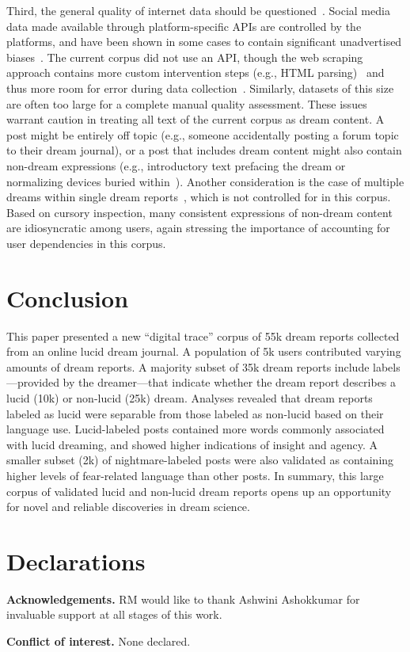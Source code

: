 \documentclass[10pt,a4paper,twocolumn]{article}
\begin{document}
\par
Third, the general quality of internet data should be questioned~\cite{ruths2014,rafaeli2019}. Social media data made available through platform-specific APIs are controlled by the platforms, and have been shown in some cases to contain significant unadvertised biases~\cite{pfeffer2018,morstatter2017}. The current corpus did not use an API, though the web scraping approach contains more custom intervention steps (e.g., HTML parsing)~\cite{landers2016} and thus more room for error during data collection~\cite{braun2018,xu2020,boegershausen2021}. Similarly, datasets of this size are often too large for a complete manual quality assessment. These issues warrant caution in treating all text of the current corpus as dream content. A post might be entirely off topic (e.g., someone accidentally posting a forum topic to their dream journal), or a post that includes dream content might also contain non-dream expressions (e.g., introductory text prefacing the dream or normalizing devices buried within~\cite{bardina2021}). Another consideration is the case of multiple dreams within single dream reports~\cite{schredl2004}, which is not controlled for in this corpus. Based on cursory inspection, many consistent expressions of non-dream content are idiosyncratic among users, again stressing the importance of accounting for user dependencies in this corpus.

\section{Conclusion}\label{sec:conclusion}

This paper presented a new ``digital trace'' corpus of 55k dream reports collected from an online lucid dream journal. A population of 5k users contributed varying amounts of dream reports. A majority subset of 35k dream reports include labels---provided by the dreamer---that indicate whether the dream report describes a lucid (10k) or non-lucid (25k) dream. Analyses revealed that dream reports labeled as lucid were separable from those labeled as non-lucid based on their language use. Lucid-labeled posts contained more words commonly associated with lucid dreaming, and showed higher indications of insight and agency. A smaller subset (2k) of nightmare-labeled posts were also validated as containing higher levels of fear-related language than other posts. In summary, this large corpus of validated lucid and non-lucid dream reports opens up an opportunity for novel and reliable discoveries in dream science.

\section*{Declarations}

\textbf{Acknowledgements.}
RM would like to thank Ashwini Ashokkumar for invaluable support at all stages of this work.

\smallskip
\noindent
\textbf{Conflict of interest.} None declared.

\raggedbottom
\printbibliography
\end{document}
